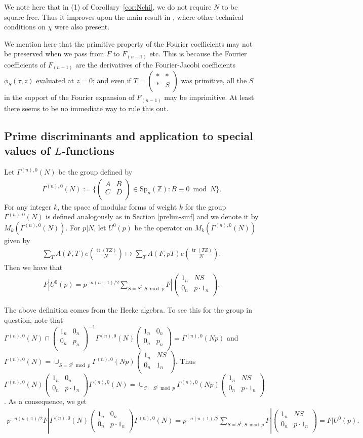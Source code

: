 \documentclass[11pt]{amsart}
\numberwithin{equation}{section}
\newcommand{\mbb}{\mathbb}
\newcommand{\mrm}{\mathrm} %
\newcommand{\smat}[4]{\left( \begin{smallmatrix} #1 & #2 \\ #3 & #4 \\ \end{smallmatrix} \right)}
\DeclareMathOperator{\tr}{tr}
\newcommand{\sumn}{\sum \nolimits}
\begin{document}
\begin{remark} \label{rmk:sydney}
    We note here that in (1) of Corollary~\ref{cor:Nchi}, we do not require $N$ to be square-free. Thus it improves upon the main result in \cite{washburn2025certain}, where other technical conditions on $\chi$ were also present.
\end{remark}

\begin{remark} \label{der}
    We mention here that the primitive property of the Fourier coefficients may not be preserved when we pass from $F$ to $F_{(n-1)}$ etc. This is because the Fourier coefficients of $F_{(n-1)}$ are the derivatives of the Fourier-Jacobi coefficients $\phi_S(\tau,z)$ evaluated at $z=0$; and even if $T= \smat{*}{*}{*}{S}$ was primitive, all the $S$ in the support of the Fourier expansion of $F_{(n-1)}$ may be imprimitive. At least there seems to be no immediate way to rule this out.
\end{remark}

\subsection{Prime discriminants and application to special values of \texorpdfstring{$L$}{l}-functions}

Let $\Gamma^{(n),0}(N)$ be the group defined by
\begin{align}
    \Gamma^{(n),0}(N):= \{\smat{A}{B}{C}{D}\in\mrm{Sp}_n(\mbb Z): B\equiv 0\bmod N \}.
\end{align}
For any integer $k$, the space of modular forms of weight $k$ for the group $\Gamma^{(n),0}(N)$ is defined analogously as in Section \ref{prelim-smf} and we denote it by $M_k(\Gamma^{(n),0}(N))$. For $p|N$, let $U^0(p)$ be the operator on $M_k(\Gamma^{(n),0}(N))$ given by
\begin{align}
    \sumn_{T} A(F,T) e(\frac{\tr(T Z)}{N})\mapsto \sumn_{T} A(F,pT) e(\frac{\tr(T Z)}{N}).
\end{align}
Then we have that
\begin{align}\label{U^0pdef}
    F|U^0(p)= p^{-n(n+1)/2}\sum_{S=S^t, S \bmod p} F|\smat{1_n}{NS}{0_n}{p\cdot 1_n}.
\end{align}

The above definition comes from the Hecke algebra. To see this for the group in question, note that $\Gamma^{(n),0}(N)\cap \smat{1_n}{0_n}{0_n}{p_n}^{-1}\Gamma^{(n),0}(N)\smat{1_n}{0_n}{0_n}{p_n}=\Gamma^{(n),0}(Np)$ and $\Gamma^{(n),0}(N)=\cup_{S=S^t\bmod p} \Gamma^{(n),0}(Np)\smat{1_n}{NS}{0_n}{1_n}$. Thus $\Gamma^{(n),0}(N)\smat{1_n}{0_n}{0_n}{p\cdot 1_n}\Gamma^{(n),0}(N)=\cup_{S=S^t\bmod p}\Gamma^{(n),0}(Np)\smat{1_n}{NS}{0_n}{p\cdot 1_n}$. 
As a consequence, we get 
\begin{align}
p^{-n(n+1)/2}F|\Gamma^{(n),0}(N)\smat{1_n}{0_n}{0_n}{p\cdot 1_n}\Gamma^{(n),0}(N)= p^{-n(n+1)/2}\sum_{S=S^t, S \bmod p} F|\smat{1_n}{NS}{0_n}{p\cdot 1_n}=F|U^0(p). 
\end{align}
\end{document}

